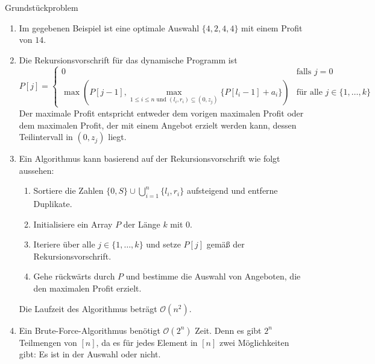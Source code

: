 \documentclass{article}
\begin{document}
\begin{exercise}{Grundstückproblem}
  \begin{solution}
    \begin{enumerate}
      \item Im gegebenen Beispiel ist eine optimale Auswahl $\{4, 2, 4, 4\}$ mit einem Profit von $14$.
      \item Die Rekursionsvorschrift für das dynamische Programm ist \[
              P[j] = \begin{cases}
                0                                                                                          & \text{falls } j = 0                     \\
                \max(P[j-1], \max_{1\leq i\leq n\text{ und } (l_i,r_i) \subseteq (0,z_j)}\{P[l_i-1]+a_i\}) & \text{für alle } j \in \{1, \ldots, k\}
              \end{cases}
            \] Der maximale Profit entspricht entweder dem vorigen maximalen Profit oder dem maximalen Profit, der mit einem Angebot erzielt werden kann, dessen Teilintervall in $(0, z_j)$ liegt.
      \item Ein Algorithmus kann basierend auf der Rekursionsvorschrift wie folgt aussehen:
            \begin{enumerate}
              \item Sortiere die Zahlen $\{0, S\} \cup \bigcup_{i=1}^n \{l_i, r_i\}$ aufsteigend und entferne Duplikate.
              \item Initialisiere ein Array $P$ der Länge $k$ mit $0$.
              \item Iteriere über alle $j \in \{1, \ldots, k\}$ und setze $P[j]$ gemäß der Rekursionsvorschrift.
              \item Gehe rückwärts durch $P$ und bestimme die Auswahl von Angeboten, die den maximalen Profit erzielt.
            \end{enumerate}
            Die Laufzeit des Algorithmus beträgt $\mathcal{O}(n^2)$.
      \item Ein Brute-Force-Algorithmus benötigt $\mathcal{O}(2^n)$ Zeit. Denn es gibt $2^n$ Teilmengen von $[n]$, da es für jedes Element in $[n]$ zwei Möglichkeiten gibt: Es ist in der Auswahl oder nicht.
    \end{enumerate}
  \end{solution}
\end{exercise}
\end{document}
